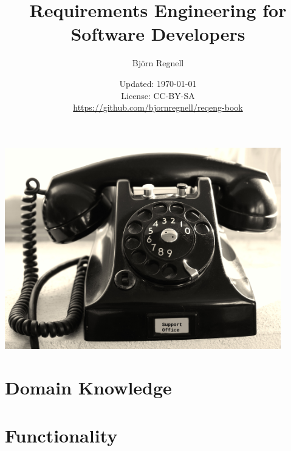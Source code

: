 \documentclass{reqengbook}
\title{
\bf\sffamily\fontsize{22}{28}\selectfont
Requirements Engineering for Software Developers
}
\author{\sffamily\fontsize{20}{30}\selectfont Björn Regnell}
\date{\vspace{2em}\sffamily\small Updated: \today 
\\ License: CC-BY-SA 
\\ \url{https://github.com/bjornregnell/reqeng-book} 
}
\begin{document}

\begin{minipage}{0.5\textwidth}
  \maketitle%
\end{minipage}%
\begin{minipage}{0.5\textwidth}
  \centering\vspace{2.2cm}
  \includegraphics[width=0.9\textwidth]{../img/phone-support.jpg}%
\end{minipage}%
\pagebreak

\setcounter{tocdepth}{2}

\begin{multicols*}{3}  %
\fontsize{8.4}{11}\selectfont

\tableofcontents
\end{multicols*}


\part{Domain Knowledge}  %






\part{Functionality}  %
\end{document}
